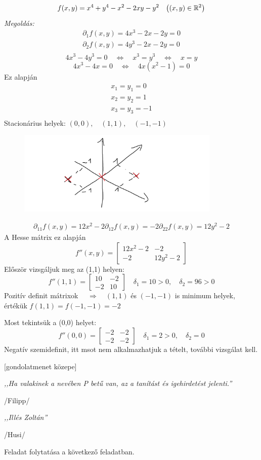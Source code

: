 \documentclass[a4paper,11.5pt]{article}
\begin{document}
	\begin{task}
		\[ f(x,y)=x^4+y^4-x^2-2xy-y^2\quad \big((x,y)\in\mathbb{R}^2\big) \]
		\textit{Megoldás:}
		\begin{align*}
			\partial_1f(x,y)=4x^3-2x-2y=0\\
			\partial_2f(x,y)=4y^3-2x-2y=0\\
		\end{align*}
		\[ 4x^3-4y^3=0\quad \Leftrightarrow\quad x^3=y^3\quad \Leftrightarrow\quad x=y \]
		\[ 4x^3-4x=0\quad \Leftrightarrow\quad 4x(x^2-1)=0 \]
		Ez alapján
		\begin{align*}
			x_1=y_1=0\\
			x_2=y_2=1\\
			x_3=y_3=-1\\
		\end{align*}
		Stacionárius helyek: $(0,0),\quad (1,1),\quad (-1,-1)$
		\begin{figure}[H]
			\centering
			\includegraphics[height=4cm]{../2zh/kepek/40.png}
			\caption{}
		\end{figure}
		\begin{align*}
			\partial_{11}f(x,y)=12x^2-2
			\partial_{12}f(x,y)=-2
			\partial_{22}f(x,y)=12y^2-2
		\end{align*}
		A Hesse mátrix ez alapján
		\[ f''(x,y)=\begin{bmatrix}
			12x^2-2&-2\\
			-2&12y^2-2
		\end{bmatrix} \]
		Először vizsgáljuk meg az (1,1) helyen:
		\[ f''(1,1)=\begin{bmatrix}
			10&-2\\
			-2&10
		\end{bmatrix}\quad \delta_1=10>0,\quad \delta_2=96>0 \] 
		Pozitív definit mátrixok $\quad \Rightarrow\quad (1,1)$ és $(-1,-1)$ is minimum helyek, értékük $f(1,1)=f(-1,-1)=-2$
		
		Most tekintsük a (0,0) helyet:
		\[ f''(0,0)=\begin{bmatrix}
			-2&-2\\
			-2&-2
		\end{bmatrix}\quad \delta_1=2>0,\quad \delta_2=0 \]
		Negatív szemidefinit, itt msot nem alkalmazhatjuk a tételt, további vizsgálat kell.
		\begin{center}
			[gondolatmenet közepe]
			\smallskip
			
			\textit{,,Ha valakinek a nevében P betű van, az a tanítást és igehirdetést jelenti.''}
			
			/Filipp/
			\medskip
			
			\textit{,,Illés Zoltán''}
			
			/Husi/
		\end{center}
		Feladat folytatása a következő feladatban.
	\end{task}
\end{document}
